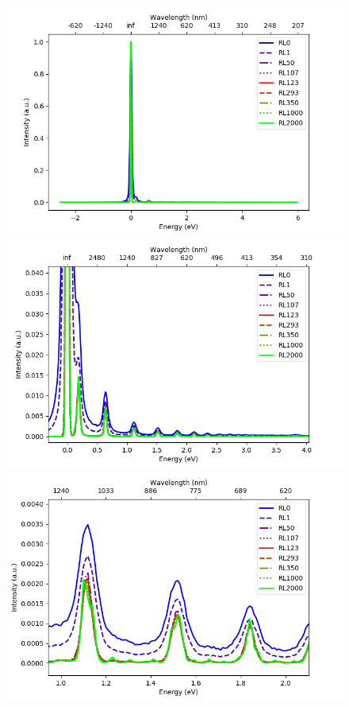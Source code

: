 \documentclass[12pt, titlepage]{article}
\begin{document}
\begin{figure}[h]
    \includegraphics[scale=0.4]{Deconvolved_spectra_SimNoise3.png}
    \includegraphics[scale=0.4]{Deconvolved_spectra_SimNoise3-2.png}
    \includegraphics[scale=0.4]{Deconvolved_spectra_SimNoise3-3.png}

\end{figure}
\end{document}
